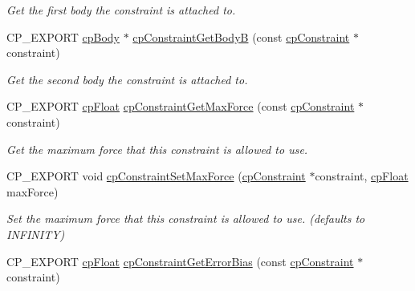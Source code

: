\begin{DoxyCompactItemize}
\begin{DoxyCompactList}\small\item\em Get the first body the constraint is attached to. \end{DoxyCompactList}\item 
\mbox{\label{group__cp_constraint_ga880a7c59fdd5bc37a775c458888898d6}} 
C\+P\+\_\+\+E\+X\+P\+O\+RT \mbox{\hyperlink{structcp_body}{cp\+Body}} $\ast$ \mbox{\hyperlink{group__cp_constraint_ga880a7c59fdd5bc37a775c458888898d6}{cp\+Constraint\+Get\+BodyB}} (const \mbox{\hyperlink{structcp_constraint}{cp\+Constraint}} $\ast$constraint)
\begin{DoxyCompactList}\small\item\em Get the second body the constraint is attached to. \end{DoxyCompactList}\item 
\mbox{\label{group__cp_constraint_ga2acc66455fd36f4aa202220cf7dff85b}} 
C\+P\+\_\+\+E\+X\+P\+O\+RT \mbox{\hyperlink{group__basic_types_gac1ed65573e035bf892505768c852d8d3}{cp\+Float}} \mbox{\hyperlink{group__cp_constraint_ga2acc66455fd36f4aa202220cf7dff85b}{cp\+Constraint\+Get\+Max\+Force}} (const \mbox{\hyperlink{structcp_constraint}{cp\+Constraint}} $\ast$constraint)
\begin{DoxyCompactList}\small\item\em Get the maximum force that this constraint is allowed to use. \end{DoxyCompactList}\item 
\mbox{\label{group__cp_constraint_gafadafd0fd9fb76eeffec535ecb0a8b1e}} 
C\+P\+\_\+\+E\+X\+P\+O\+RT void \mbox{\hyperlink{group__cp_constraint_gafadafd0fd9fb76eeffec535ecb0a8b1e}{cp\+Constraint\+Set\+Max\+Force}} (\mbox{\hyperlink{structcp_constraint}{cp\+Constraint}} $\ast$constraint, \mbox{\hyperlink{group__basic_types_gac1ed65573e035bf892505768c852d8d3}{cp\+Float}} max\+Force)
\begin{DoxyCompactList}\small\item\em Set the maximum force that this constraint is allowed to use. (defaults to I\+N\+F\+I\+N\+I\+TY) \end{DoxyCompactList}\item 
\mbox{\label{group__cp_constraint_gadffe7197ac17d8cef847e71fa74d6b2d}} 
C\+P\+\_\+\+E\+X\+P\+O\+RT \mbox{\hyperlink{group__basic_types_gac1ed65573e035bf892505768c852d8d3}{cp\+Float}} \mbox{\hyperlink{group__cp_constraint_gadffe7197ac17d8cef847e71fa74d6b2d}{cp\+Constraint\+Get\+Error\+Bias}} (const \mbox{\hyperlink{structcp_constraint}{cp\+Constraint}} $\ast$constraint)

\end{DoxyCompactItemize}
